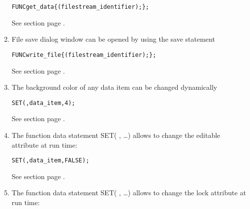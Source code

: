 \begin{enumerate}
\begin{boxedminipage}[t]{\linewidth}
\begin{alltt}
  FUNC get_data \{ \OPEN(filestream_identifier); \};
\end{alltt}
\end{boxedminipage}

See section  page \pageref{fudatastatements}. \\
\item File save dialog window can be opened by using the save statement

\begin{boxedminipage}[t]{\linewidth}
\begin{alltt}
  FUNC write_file \{ \SAVE(filestream_identifier); \};
\end{alltt}
\end{boxedminipage}

See section  page \pageref{fudatastatements}. \\
\item The background color of any data item can be changed dynamically

\begin{boxedminipage}[t]{\linewidth}
\begin{alltt}
  SET( \COLOR, data_item, 4 );
\end{alltt}
\end{boxedminipage}

See section  page 
  \pageref{fudatastatements}. \\
\item 
The function data statement SET( \EDITABLE, \ldots)
allows to change the editable attribute at run time:

\begin{boxedminipage}[t]{\linewidth}
\begin{alltt}
  SET( \EDITABLE, data_item, FALSE );
\end{alltt}
\end{boxedminipage}

See section  page 
  \pageref{fudatastatements}.
\item 
The function data statement SET( \LOCK, \ldots)
allows to change the lock attribute at run time:


\end{enumerate}
